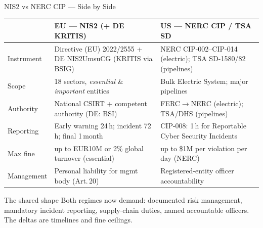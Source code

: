 \documentclass[aspectratio=169,11pt]{beamer}
\begin{document}
\begin{frame}{NIS2 vs NERC CIP --- Side by Side}
\centering
\renewcommand{\arraystretch}{0.82}
\scriptsize
\begin{tabular}{|p{22mm}|p{42mm}|p{42mm}|}
\hline
\rowcolor{slidePanel}
 & \textbf{EU --- NIS2 (+ DE KRITIS)} & \textbf{US --- NERC CIP / TSA SD} \\
\hline
Instrument   & Directive (EU) 2022/2555 + DE NIS2UmsuCG (KRITIS via BSIG) & NERC CIP-002--CIP-014 (electric); TSA SD-1580/82 (pipelines) \\
\hline
Scope        & 18 sectors, \emph{essential} \& \emph{important} entities & Bulk Electric System; major pipelines \\
\hline
Authority    & National CSIRT + competent authority (DE: BSI) & FERC$\to$NERC (electric); TSA/DHS (pipelines) \\
\hline
Reporting    & Early warning 24\,h; incident 72\,h; final 1\,month & CIP-008: 1\,h for Reportable Cyber Security Incidents \\
\hline
Max fine     & up to EUR10M or 2\% global turnover (essential) & up to \$1M per violation per day (NERC) \\
\hline
Management   & Personal liability for mgmt body (Art.\,20) & Registered-entity officer accountability \\
\hline
\end{tabular}
\par\vspace{2mm}
\begin{importantbox}{The shared shape}
Both regimes now demand: documented risk management, mandatory incident reporting, supply-chain duties, named accountable officers. The deltas are timelines and fine ceilings.
\end{importantbox}
\end{frame}
\end{document}
